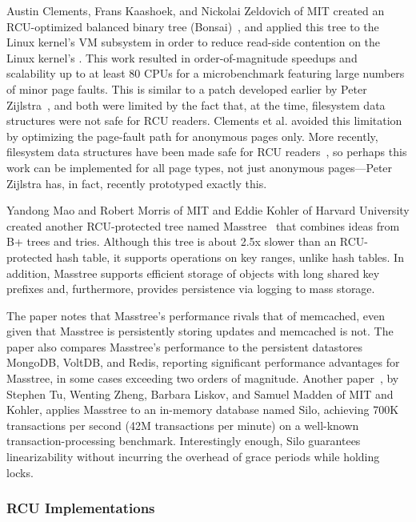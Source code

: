 Austin Clements, Frans Kaashoek, and Nickolai Zeldovich
of MIT created an RCU-optimized balanced binary tree
(Bonsai)~\cite{AustinClements2012RCULinux:mmapsem}, and applied this
tree to the Linux kernel's VM subsystem in order to reduce read-side
contention on the Linux kernel's .
This work resulted in order-of-magnitude speedups and scalability up to
at least 80 CPUs for a microbenchmark featuring large numbers of minor
page faults.
This is similar to a patch developed earlier by
Peter Zijlstra~\cite{PeterZijlstra2014SpeculativePageFault}, and both
were limited by the fact that, at the time, filesystem data structures
were not safe for RCU readers.
Clements et al. avoided this limitation by optimizing the page-fault
path for anonymous pages only.
More recently, filesystem data structures have been made safe for RCU
readers~\cite{JonathanCorbet2010dcacheRCU,JonathanCorbet2011dcacheRCUbug},
so perhaps this work can be implemented for all page types, not just
anonymous pages---Peter Zijlstra has, in fact, recently prototyped
exactly this.

Yandong Mao and Robert Morris of MIT and Eddie Kohler of
Harvard University created another RCU-protected tree named
Masstree~\cite{Mao:2012:CCF:2168836.2168855} that combines ideas from B+
trees and tries.
Although this tree is about 2.5x slower than an RCU-protected hash table,
it supports operations on key ranges, unlike hash tables.
In addition, Masstree supports efficient storage of objects with long
shared key prefixes and, furthermore, provides persistence via logging
to mass storage.

The paper notes that Masstree's performance rivals that of memcached, even
given that Masstree is persistently storing updates and memcached is not.
The paper also compares Masstree's performance to the persistent
datastores MongoDB, VoltDB, and Redis, reporting significant performance
advantages for Masstree, in some cases exceeding two orders of magnitude.
Another paper~\cite{Tu:2013:STM:2517349.2522713}, by Stephen Tu,
Wenting Zheng, Barbara Liskov, and Samuel Madden of MIT and Kohler,
applies Masstree to an in-memory database named Silo, achieving 700K
transactions per second (42M transactions per minute) on a well-known
transaction-processing benchmark.
Interestingly enough, Silo guarantees linearizability without incurring
the overhead of grace periods while holding locks.

\subsubsection{RCU Implementations}
\label{sec:defer:RCU Implementations}

